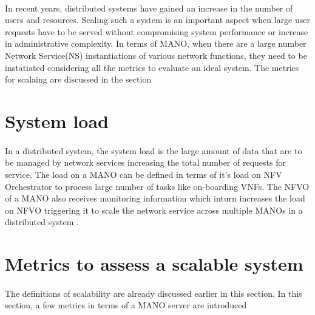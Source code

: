 \paragraph{}
In recent years, distributed systems have gained an increase in the number of users and resources. Scaling such a system is an important aspect when large user requests have to be served without compromising system performance or increase in administrative complexity. In terms of MANO, when there are a large number Network Service(NS) instantiations of various network functions, they need to be instatiated considering all the metrics to evaluate an ideal system. The metrics for scalaing are discussed in the section 



\section{System load}
\paragraph{}In a distributed system, the system load is the large amount of data that are to be managed by network services increasing the total number of requests for service.
The load on a MANO can be defined in terms of it's load on NFV Orchestrator to process large number of tasks like on-boarding VNFs. The NFVO of a MANO also receives monitoring information which inturn increases the load on NFVO triggering it to scale the network service across multiple MANOs in a distributed system \cite{soenen2017optimising}.


\section{Metrics to assess a scalable system}
\label{Metrics}
\paragraph{}The definitions of scalability are already discussed earlier in this section. In this section, a few metrics in terms of a MANO server are introduced

